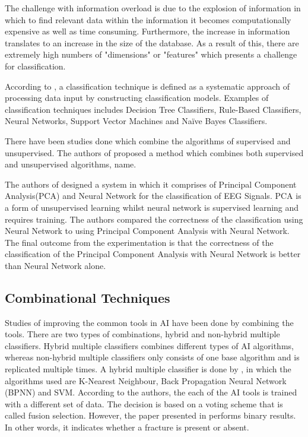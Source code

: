 \documentclass[11pt,twocolumn]{witseiepaper}
\begin{document}
	The challenge with information overload is due to the explosion of information in which to find relevant data within the information it becomes computationally expensive as well as time consuming. Furthermore, the increase in information translates to an increase in the size of the database. As a result of this, there are extremely high numbers of "dimensions" or "features" which presents a challenge for classification. 
	
	According to \cite{Mahendran2011}, a classification technique is defined as a systematic approach of processing data input by constructing classification models. Examples of classification techniques includes Decision Tree Classifiers, Rule-Based Classifiers, Neural Networks, Support Vector Machines and Na\"{i}ve Bayes Classifiers.
	
	There have been studies done which combine the algorithms of supervised and unsupervised. The authors of \cite{neagoe_new_2014} proposed a method which combines both supervised and unsupervised algorithms, name.
	
	The authors of \cite{kottaimalai_eeg_2013} designed a system in which it comprises of Principal Component Analysis(PCA) and Neural Network for the classification of EEG Signals. PCA is a form of unsupervised learning whilst neural network is supervised learning and requires training. The authors compared the correctness of the classification using Neural Network to using Principal Component Analysis with Neural Network. The final outcome from the experimentation is that the correctness of the classification of the Principal Component Analysis with Neural Network is better than Neural Network alone. 
	
	\subsection{Combinational Techniques}
	Studies of improving the common tools in AI have been done by combining the tools. There are two types of combinations, hybrid and non-hybrid multiple classifiers. Hybrid multiple classifiers combines different types of AI algorithms, whereas non-hybrid multiple classifiers only consists of one base algorithm and is replicated multiple times. A hybrid multiple classifier is done by \cite{multiple_classification}, in which the algorithms used are K-Nearest Neighbour, Back Propagation Neural Network (BPNN) and SVM. According to the authors, the each of the AI tools is trained with a different set of data. The decision is based on a voting scheme that is called fusion selection. However, the paper presented in \cite{multiple_classification} performs binary results. In other words, it indicates whether a fracture is present or absent. 
	
\end{document}
